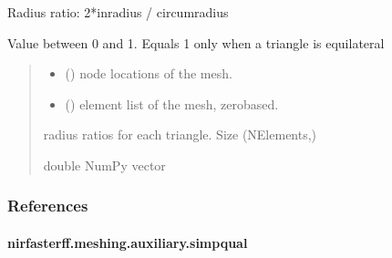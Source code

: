 \documentclass[letterpaper,10pt,english]{sphinxmanual}
\begin{document}
\begin{fulllineitems}
\label{\detokenize{_autosummary/nirfasterff.meshing.auxiliary.quality_triangle_radius:nirfasterff.meshing.auxiliary.quality_triangle_radius}}
\pysigstartsignatures
\pysiglinewithargsret
{}
{\sphinxparamcomma {}}
{}
\pysigstopsignatures
\sphinxAtStartPar
Radius ratio: 2*inradius / circumradius

\sphinxAtStartPar
Value between 0 and 1. Equals 1 only when a triangle is equilateral
\begin{quote}\begin{description}
\begin{itemize}
\item {} 
\sphinxAtStartPar
{} () \textendash{} node locations of the mesh.

\item {} 
\sphinxAtStartPar
{} () \textendash{} element list of the mesh, zero\sphinxhyphen{}based.

\end{itemize}

\sphinxAtStartPar
radius ratios for each triangle. Size (NElements,)

\sphinxAtStartPar
double NumPy vector

\end{description}\end{quote}
\subsubsection*{References}

\sphinxAtStartPar
{}

\end{fulllineitems}


\sphinxstepscope


\paragraph{nirfasterff.meshing.auxiliary.simpqual}
\label{\detokenize{_autosummary/nirfasterff.meshing.auxiliary.simpqual:nirfasterff-meshing-auxiliary-simpqual}}\label{\detokenize{_autosummary/nirfasterff.meshing.auxiliary.simpqual::doc}}
\end{document}
